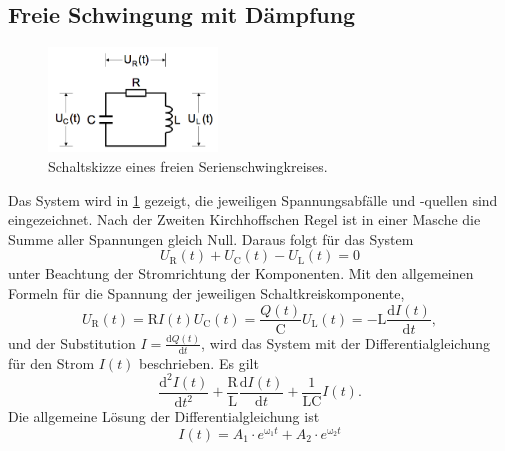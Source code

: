 \subsection{Freie Schwingung mit Dämpfung}
\label{sec:theorie1}
\begin{figure}[h]
	\centering
	\includegraphics[width=0.4\textwidth]{Bilder/Maschenfoto1.png}
	\caption{Schaltskizze eines freien Serienschwingkreises. \cite{v354}}
	\label{fig:schaltkreis_rein}
\end{figure}
Das System wird in \ref{fig:schaltkreis_rein} gezeigt, die jeweiligen Spannungsabfälle und -quellen sind eingezeichnet.
Nach der Zweiten Kirchhoffschen Regel ist in einer Masche die Summe aller Spannungen gleich Null. 
Daraus folgt für das System
\begin{equation}
	U_\text{R}(t)+U_\text{C}(t)-U_\text{L}(t)=0
\end{equation}
unter Beachtung der Stromrichtung der Komponenten.
Mit den allgemeinen Formeln für die Spannung der jeweiligen Schaltkreiskomponente,
\begin{subequations}
\begin{equation}
		U_\text{R}(t) = \text{R} I(t)
\end{equation}
\begin{equation}
		U_\text{C}(t) = \frac{Q(t)}{\text{C}}
\end{equation}
\begin{equation}
		U_\text{L}(t) = -\text{L}\frac{\mathup{d}I(t)}{\mathup{d}t},
\end{equation}
\label{eq:austauscher}
\end{subequations}
und der Substitution
$I=\frac{\mathup{d}Q(t)}{\mathup{d}t}$,
wird das System mit der Differentialgleichung für den Strom $I(t)$ beschrieben.
Es gilt
\begin{equation}
	\frac{\mathup{d^2}I(t)}{\mathup{d}t^2}+\frac{\mathup{R}}{\mathup{L}}\frac{\mathup{d}I(t)}{\mathup{d}t}+\frac{1}{\mathup{LC}}I(t).
\end{equation}
Die allgemeine Lösung der Differentialgleichung ist
\begin{equation}
	I(t) = A_1\cdot e^{\mathup{\omega_1}t} +A_2\cdot e^{\mathup{\omega_2}t}
	\label{eq:allgloesung}
\end{equation}
